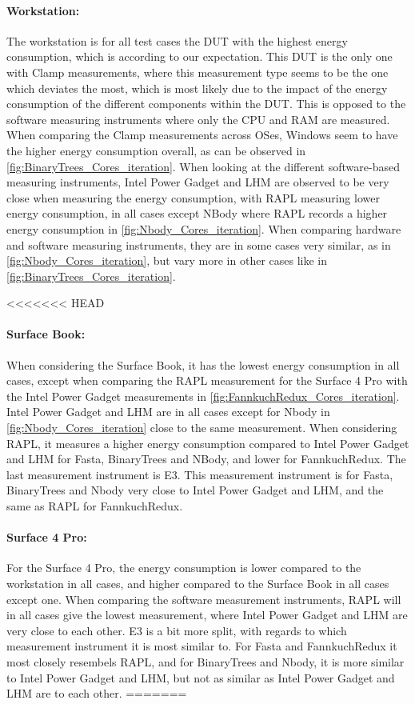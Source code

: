\paragraph{Workstation:} The workstation is for all test cases the DUT with the highest energy consumption, which is according to our expectation. This DUT is the only one with Clamp measurements, where this measurement type seems to be the one which deviates the most, which is most likely due to the impact of the energy consumption of the different components within the DUT. This is opposed to the software measuring instruments where only the CPU and RAM are measured. When comparing the Clamp measurements across OSes, Windows seem to have the higher energy consumption overall, as can be observed in \cref{fig:BinaryTrees_Cores_iteration}. When looking at the different software-based measuring instruments, Intel Power Gadget and LHM are observed to be very close when measuring the energy consumption, with RAPL measuring lower energy consumption, in all cases except NBody where RAPL records a higher energy consumption in \cref{fig:Nbody_Cores_iteration}. When comparing hardware and software measuring instruments, they are in some cases very similar, as in \cref{fig:Nbody_Cores_iteration}, but vary more in other cases like in \cref{fig:BinaryTrees_Cores_iteration}.

<<<<<<< HEAD
\paragraph{Surface Book:} When considering the Surface Book, it has the lowest energy consumption in all cases, except when comparing the RAPL measurement for the Surface 4 Pro with the Intel Power Gadget measurements in \cref{fig:FannkuchRedux_Cores_iteration}. Intel Power Gadget and LHM are in all cases except for Nbody in \cref{fig:Nbody_Cores_iteration} close to the same measurement. When considering RAPL, it measures a higher energy consumption compared to Intel Power Gadget and LHM for Fasta, BinaryTrees and NBody, and lower for FannkuchRedux. The last measurement instrument is E3. This measurement instrument is for Fasta, BinaryTrees and Nbody very close to Intel Power Gadget and LHM, and the same as RAPL for FannkuchRedux.

\paragraph{Surface 4 Pro:} For the Surface 4 Pro, the energy consumption is lower compared to the workstation in all cases, and higher compared to the Surface Book in all cases except one. When comparing the software measurement instruments, RAPL will in all cases give the lowest measurement, where Intel Power Gadget and LHM are very close to each other. E3 is a bit more split, with regards to which measurement instrument it is most similar to. For Fasta and FannkuchRedux it most closely resembels RAPL, and for BinaryTrees and Nbody, it is more similar to Intel Power Gadget and LHM, but not as similar as Intel Power Gadget and LHM are to each other.
=======
